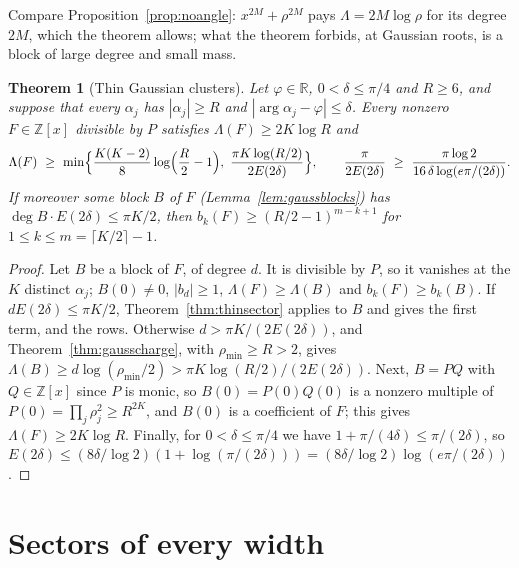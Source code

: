 \documentclass[11pt]{article}
\newtheorem{theorem}{Theorem}[section]
\newcommand{\R}{\mathbb R}
\begin{document}
Compare Proposition~\ref{prop:noangle}: $x^{2M}+\rho^{2M}$ pays
$\Lambda=2M\log\rho$ for its degree $2M$, which the theorem allows; what the
theorem forbids, at Gaussian roots, is a block of large degree and small
mass.

\begin{theorem}[Thin Gaussian clusters]\label{thm:thingauss}
Let $\varphi\in\R$, $0<\delta\le\pi/4$ and $R\ge6$, and suppose that every
$\alpha_j$ has $|\alpha_j|\ge R$ and $|\arg\alpha_j-\varphi|\le\delta$.  Every
nonzero $F\in\mathbb Z[x]$ divisible by $P$ satisfies $\Lambda(F)\ge2K\log R$
and
\[
  \Lambda(F)\ \ge\ \min\Bigl\{\frac{K(K-2)}8\log\Bigl(\frac R2-1\Bigr),\
  \frac{\pi K\log(R/2)}{2E(2\delta)}\Bigr\},
  \qquad
  \frac{\pi}{2E(2\delta)}\ \ge\ \frac{\pi\log2}{16\,\delta\log(e\pi/(2\delta))}.
\]
If moreover some block $B$ of $F$ (Lemma~\ref{lem:gaussblocks}) has
$\deg B\cdot E(2\delta)\le\pi K/2$, then
$b_k(F)\ge(R/2-1)^{m-k+1}$ for $1\le k\le m=\lceil K/2\rceil-1$.
\end{theorem}

\begin{proof}
Let $B$ be a block of $F$, of degree $d$.  It is divisible by $P$, so it
vanishes at the $K$ distinct $\alpha_j$; $B(0)\ne0$, $|b_d|\ge1$,
$\Lambda(F)\ge\Lambda(B)$ and $b_k(F)\ge b_k(B)$.  If $dE(2\delta)\le\pi K/2$,
Theorem~\ref{thm:thinsector} applies to $B$ and gives the first term, and the
rows.  Otherwise $d>\pi K/(2E(2\delta))$, and Theorem~\ref{thm:gausscharge},
with $\rho_{\min}\ge R>2$, gives
$\Lambda(B)\ge d\log(\rho_{\min}/2)>\pi K\log(R/2)/(2E(2\delta))$.  Next,
$B=PQ$ with $Q\in\mathbb Z[x]$ since $P$ is monic, so $B(0)=P(0)Q(0)$ is a
nonzero multiple of $P(0)=\prod_j\rho_j^2\ge R^{2K}$, and $B(0)$ is a
coefficient of $F$; this gives $\Lambda(F)\ge2K\log R$.  Finally, for
$0<\delta\le\pi/4$ we have $1+\pi/(4\delta)\le\pi/(2\delta)$, so
$E(2\delta)\le(8\delta/\log2)(1+\log(\pi/(2\delta)))
=(8\delta/\log2)\log(e\pi/(2\delta))$.
\end{proof}


\section{Sectors of every width}\label{sec:widesectors}
\end{document}
